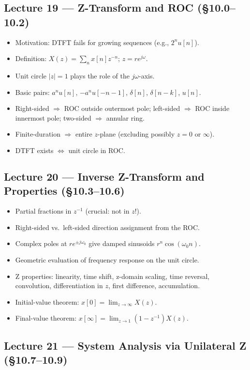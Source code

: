 \documentclass{article}
\begin{document}
\subsection*{Lecture 19 --- Z-Transform and ROC (\S10.0--10.2)}
\begin{itemize}
  \item Motivation: DTFT fails for growing sequences (e.g., $2^n u[n]$).
  \item Definition: $X(z) = \sum_n x[n] z^{-n}$; $z = re^{j\omega}$.
  \item Unit circle $|z|=1$ plays the role of the $j\omega$-axis.
  \item Basic pairs: $a^n u[n]$, $-a^n u[-n-1]$, $\delta[n]$, $\delta[n-k]$, $u[n]$.
  \item Right-sided $\Rightarrow$ ROC outside outermost pole; left-sided $\Rightarrow$ ROC inside innermost pole; two-sided $\Rightarrow$ annular ring.
  \item Finite-duration $\Rightarrow$ entire $z$-plane (excluding possibly $z=0$ or $\infty$).
  \item DTFT exists $\Leftrightarrow$ unit circle in ROC.
\end{itemize}

\subsection*{Lecture 20 --- Inverse Z-Transform and Properties (\S10.3--10.6)}
\begin{itemize}
  \item Partial fractions in $z^{-1}$ (crucial: not in $z$!).
  \item Right-sided vs.\ left-sided direction assignment from the ROC.
  \item Complex poles at $re^{\pm j\omega_0}$ give damped sinusoids $r^n\cos(\omega_0 n)$.
  \item Geometric evaluation of frequency response on the unit circle.
  \item Z properties: linearity, time shift, z-domain scaling, time reversal, convolution, differentiation in $z$, first difference, accumulation.
  \item Initial-value theorem: $x[0] = \lim_{z\to\infty} X(z)$.
  \item Final-value theorem: $x[\infty] = \lim_{z\to 1}(1-z^{-1})X(z)$.
\end{itemize}

\subsection*{Lecture 21 --- System Analysis via Unilateral Z (\S10.7--10.9)}
\end{document}
